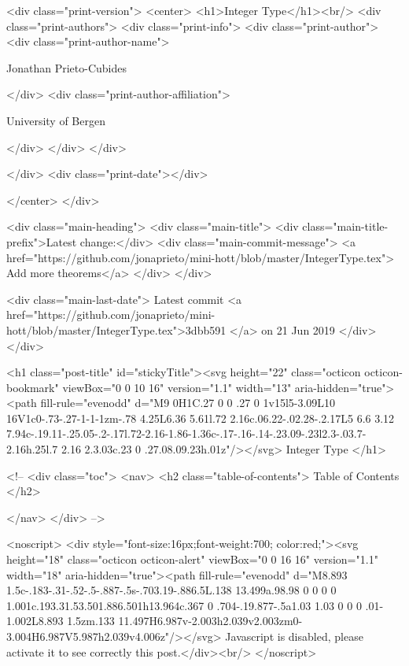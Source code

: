   <div class="print-version">
    <center>
      <h1>Integer Type</h1><br/>
        <div class="print-authors">
          <div class="print-info">
            <div class="print-author">
              <div class="print-author-name">
                
                  Jonathan Prieto-Cubides
                
              </div>
              <div class="print-author-affiliation">
                
                  University of Bergen
                
                </div>
            </div>
          </div>
          
          
        </div>
        <div class="print-date"></div>
        
        
    </center>
  </div>

  
  <div class="main-heading">
    <div class="main-title">
      <div class="main-title-prefix">Latest change:</div>
      <div class="main-commit-message">
            <a href="https://github.com/jonaprieto/mini-hott/blob/master/IntegerType.tex">
              Add more theorems</a>
      </div>
    </div>

    <div class="main-last-date">
      Latest commit <a href="https://github.com/jonaprieto/mini-hott/blob/master/IntegerType.tex">3dbb591 </a> on  21 Jun 2019
    </div>
  </div>
  
  <h1 class="post-title" id="stickyTitle"><svg height="22" class="octicon octicon-bookmark" viewBox="0 0 10 16" version="1.1" width="13" aria-hidden="true"><path fill-rule="evenodd" d="M9 0H1C.27 0 0 .27 0 1v15l5-3.09L10 16V1c0-.73-.27-1-1-1zm-.78 4.25L6.36 5.61l.72 2.16c.06.22-.02.28-.2.17L5 6.6 3.12 7.94c-.19.11-.25.05-.2-.17l.72-2.16-1.86-1.36c-.17-.16-.14-.23.09-.23l2.3-.03.7-2.16h.25l.7 2.16 2.3.03c.23 0 .27.08.09.23h.01z"/></svg> Integer Type
  </h1>

  <!-- 
  <div class="toc">
    <nav>
    <h2 class="table-of-contents"> Table of Contents </h2>
      

    </nav>
  </div>
   -->

  <noscript>
  <div style="font-size:16px;font-weight:700; color:red;"><svg height="18" class="octicon octicon-alert" viewBox="0 0 16 16" version="1.1" width="18" aria-hidden="true"><path fill-rule="evenodd" d="M8.893 1.5c-.183-.31-.52-.5-.887-.5s-.703.19-.886.5L.138 13.499a.98.98 0 0 0 0 1.001c.193.31.53.501.886.501h13.964c.367 0 .704-.19.877-.5a1.03 1.03 0 0 0 .01-1.002L8.893 1.5zm.133 11.497H6.987v-2.003h2.039v2.003zm0-3.004H6.987V5.987h2.039v4.006z"/></svg> Javascript is disabled, please activate it to see correctly this post.</div><br/>
  </noscript>


